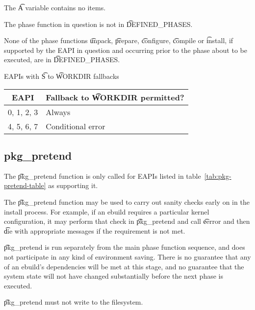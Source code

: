 \begin{compactitem}
\item The \t{A} variable contains no items.
\item The phase function in question is not in \t{DEFINED_PHASES}.
\item None of the phase functions \t{unpack}, \t{prepare}, \t{configure}, \t{compile} or \t{install},
    if supported by the EAPI in question and occurring prior to the phase about to be executed, are
    in \t{DEFINED_PHASES}.
\end{compactitem}

\begin{centertable}{EAPIs with \t{S} to \t{WORKDIR} fallbacks}
    \label{tab:s-fallback-table}
    \begin{tabular}{ll}
      \toprule
      \multicolumn{1}{c}{\textbf{EAPI}} &
      \multicolumn{1}{c}{\textbf{Fallback to \t{WORKDIR} permitted?}} \\
      \midrule
      0, 1, 2, 3        & Always            \\
      4, 5, 6, 7        & Conditional error \\
      \bottomrule
    \end{tabular}
\end{centertable}

\subsection{pkg_pretend}

 The \t{pkg_pretend} function is only called for EAPIs listed in
table~\ref{tab:pkg-pretend-table} as supporting it.

The \t{pkg_pretend} function may be used to carry out sanity checks early on in the install
process. For example, if an ebuild requires a particular kernel configuration, it may perform that
check in \t{pkg_pretend} and call \t{eerror} and then \t{die} with appropriate messages if the
requirement is not met.

\t{pkg_pretend} is run separately from the main phase function sequence, and does not participate
in any kind of environment saving. There is no guarantee that any of an ebuild's dependencies will
be met at this stage, and no guarantee that the system state will not have changed substantially
before the next phase is executed.

\t{pkg_pretend} must not write to the filesystem.

